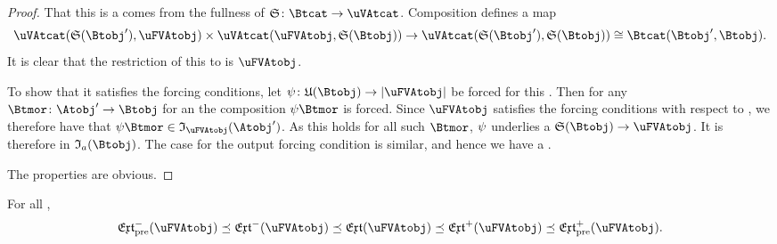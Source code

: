 \documentclass[%
12pt,%
arxiv,%
defaults
]{myclass}
\begin{document}
\begin{proof}
That this is a \uVBtobj comes from the fullness of \(\sfunc \colon \Btcat \to \uVAtcat\).
Composition defines a map
%
\[
  \Hom{\uVAtcat}{\sfunc(\Btobj')}{\uFVAtobj} \times   \Hom{\uVAtcat}{\uFVAtobj}{\sfunc(\Btobj)} \to \Hom{\uVAtcat}{\sfunc(\Btobj')}{\sfunc(\Btobj)} \cong \Hom{\Btcat}{\Btobj'}{\Btobj}.
\]
%
It is clear that the restriction of this to \Atcat is \(\uFVAtobj\).

To show that it satisfies the forcing conditions, let \(\ifn \colon \ufunc(\Btobj) \to \forfunc[\uFVAtobj]\) be forced for this \uVBtobjalt.
Then for any \Btmor \(\Btmor \colon \Atobj' \to \Btobj\) for an \Atobj[\Atobj'] the composition \(\ifn \Btmor\) is forced.
Since \(\uFVAtobj\) satisfies the forcing conditions with respect to \Atcat, we therefore have that \(\ifn \Btmor \in \itest_{\uFVAtobj}(\Atobj')\).
As this holds for all such \(\Btmor\), \(\psi\) underlies a \uVAtmor \(\sfunc(\Btobj) \to \uFVAtobj\).
It is therefore in \(\itest_a(\Btobj)\).
The case for the output forcing condition is similar, and hence we have a \uFVBtobjalt.

The properties are obvious.
\end{proof}


\begin{lemma}
For all \uFVAtobjs[\uFVAtobj],
%
\[
  \PMextfunc(\uFVAtobj) \preceq \Mextfunc(\uFVAtobj) \preceq \extfunc(\uFVAtobj) \preceq \Jextfunc(\uFVAtobj) \preceq \PJextfunc(\uFVAtobj).
\]
\end{lemma}
\end{document}
